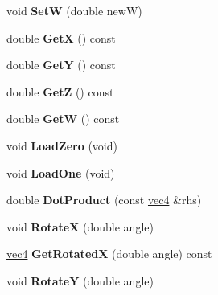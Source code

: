 \begin{DoxyCompactItemize}
\item 
\hypertarget{classmath_1_1vec4_a02217f9084bd45233733cc0e71011057}{
void {\bfseries SetW} (double newW)}
\label{classmath_1_1vec4_a02217f9084bd45233733cc0e71011057}

\item 
\hypertarget{classmath_1_1vec4_a37773d06bf3c68718d317efc93513f60}{
double {\bfseries GetX} () const }
\label{classmath_1_1vec4_a37773d06bf3c68718d317efc93513f60}

\item 
\hypertarget{classmath_1_1vec4_af143dd8a07018d01ab57f7e60fe19e3d}{
double {\bfseries GetY} () const }
\label{classmath_1_1vec4_af143dd8a07018d01ab57f7e60fe19e3d}

\item 
\hypertarget{classmath_1_1vec4_acd9b9b032184f6606d9e3209b39b3d3f}{
double {\bfseries GetZ} () const }
\label{classmath_1_1vec4_acd9b9b032184f6606d9e3209b39b3d3f}

\item 
\hypertarget{classmath_1_1vec4_aac351896cd5c869f1661ff77cae9da0b}{
double {\bfseries GetW} () const }
\label{classmath_1_1vec4_aac351896cd5c869f1661ff77cae9da0b}

\item 
\hypertarget{classmath_1_1vec4_a89f5cbcdaebeba00e49ca3ad48b50e54}{
void {\bfseries LoadZero} (void)}
\label{classmath_1_1vec4_a89f5cbcdaebeba00e49ca3ad48b50e54}

\item 
\hypertarget{classmath_1_1vec4_af2ef943623b385a1f93d7369005c18b6}{
void {\bfseries LoadOne} (void)}
\label{classmath_1_1vec4_af2ef943623b385a1f93d7369005c18b6}

\item 
\hypertarget{classmath_1_1vec4_a446e5b103f924437bd614ba40d0c7a70}{
double {\bfseries DotProduct} (const \hyperlink{classmath_1_1vec4}{vec4} \&rhs)}
\label{classmath_1_1vec4_a446e5b103f924437bd614ba40d0c7a70}

\item 
\hypertarget{classmath_1_1vec4_a4bf43cb3afb4e187ffed2637875c9660}{
void {\bfseries RotateX} (double angle)}
\label{classmath_1_1vec4_a4bf43cb3afb4e187ffed2637875c9660}

\item 
\hypertarget{classmath_1_1vec4_a702d2c82ae6bc20db44abe5c15873d31}{
\hyperlink{classmath_1_1vec4}{vec4} {\bfseries GetRotatedX} (double angle) const }
\label{classmath_1_1vec4_a702d2c82ae6bc20db44abe5c15873d31}

\item 
\hypertarget{classmath_1_1vec4_ad0f769ff6c8a5284033b7a527b695450}{
void {\bfseries RotateY} (double angle)}
\label{classmath_1_1vec4_ad0f769ff6c8a5284033b7a527b695450}


\end{DoxyCompactItemize}
